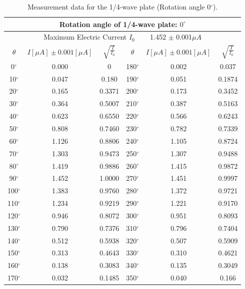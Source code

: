 \documentclass[a4paper,12pt]{article}
\begin{document}
\begin{table}[h]
\begin{center}
\begin{tabular}{|c|c|c||c|c|c|}
\hline
\multicolumn{6}{|c|}{Rotation angle of 1/4-wave plate: $0^{\circ}$}\\
\hline 
\multicolumn{6}{|c|}{Maximum Electric Current $I_0$ ~~~ 1.452 $\pm$ 0.001$\mu A$}\\
\hline 
$\theta$ & $I [\mu A] \pm 0.001 [\mu A]$ & $\sqrt{\frac{I}{I_0}}$ & $\theta$ & $I [\mu A] \pm 0.001 [\mu A]$ & $\sqrt{\frac{I}{I_0}}$ \\
\hline
0$^{\circ}$ & 0.000 & 0 & 180$^{\circ}$ & 0.002 & 0.037 \\
\hline 
10$^{\circ}$ & 0.047 & 0.180 & 190$^{\circ}$ & 0.051 & 0.1874\\
\hline
20$^{\circ}$ & 0.165 & 0.3371 & 200$^{\circ}$ & 0.173 & 0.3452\\
\hline
30$^{\circ}$ & 0.364 & 0.5007 & 210$^{\circ}$ & 0.387 & 0.5163\\
\hline
40$^{\circ}$ & 0.623 & 0.6550 & 220$^{\circ}$ & 0.566 & 0.6243\\
\hline
50$^{\circ}$ & 0.808 & 0.7460 & 230$^{\circ}$ & 0.782 & 0.7339\\
\hline
60$^{\circ}$ & 1.126 & 0.8806 & 240$^{\circ}$ & 1.105 & 0.8724\\
\hline
70$^{\circ}$ & 1.303 & 0.9473 & 250$^{\circ}$ & 1.307 & 0.9488\\
\hline
80$^{\circ}$ & 1.419 & 0.9886 & 260$^{\circ}$ & 1.415 & 0.9872\\
\hline
90$^{\circ}$ & 1.452 & 1.0000 & 270$^{\circ}$ & 1.451 & 0.9997\\
\hline
100$^{\circ}$ & 1.383 & 0.9760 & 280$^{\circ}$ & 1.372 & 0.9721\\
\hline
110$^{\circ}$ & 1.234 & 0.9219 & 290$^{\circ}$ & 1.221 & 0.9170\\
\hline
120$^{\circ}$ & 0.946 & 0.8072 & 300$^{\circ}$ & 0.951 & 0.8093\\
\hline
130$^{\circ}$ & 0.790 & 0.7376 & 310$^{\circ}$ & 0.796 & 0.7404\\
\hline
140$^{\circ}$ & 0.512 & 0.5938 & 320$^{\circ}$ & 0.507 & 0.5909\\
\hline
150$^{\circ}$ & 0.313 & 0.4643 & 330$^{\circ}$ & 0.310 & 0.4621\\
\hline
160$^{\circ}$ & 0.138 & 0.3083 & 340$^{\circ}$ & 0.135 & 0.3049\\
\hline
170$^{\circ}$ & 0.032 & 0.1485 & 350$^{\circ}$ & 0.040 & 0.166\\
\hline
\end{tabular}
\caption{Measurement data for the 1/4-wave plate (Rotation angle 0$^{\circ}$).}
\end{center}
\end{table}
\end{document}
